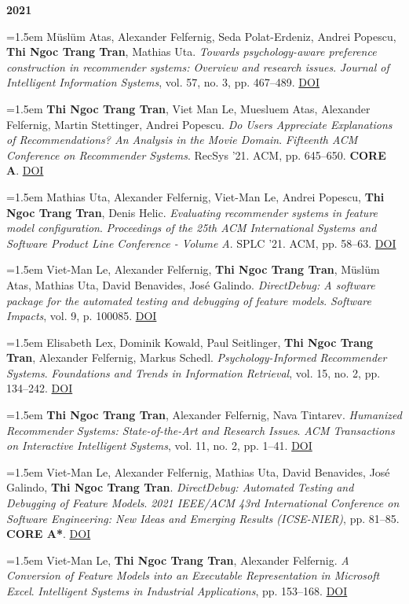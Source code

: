 \documentclass[11pt,a4paper]{article}
\newcommand{\pub}[1]{%
  \par\noindent\hangindent=1.5em\hangafter=1 #1\par\vspace{0.5ex}}
\newcommand{\pubyear}[1]{\vspace{0.7ex}\par\noindent\textbf{#1}\par\vspace{0.2ex}}
\begin{document}
\pubyear{2021}
\pub{Müslüm Atas, Alexander Felfernig, Seda Polat-Erdeniz, Andrei Popescu, \textbf{Thi Ngoc Trang Tran}, Mathias Uta. \textit{Towards psychology-aware preference construction in recommender systems: Overview and research issues}. \textit{Journal of Intelligent Information Systems}, vol. 57, no. 3, pp. 467–489. \href{https://doi.org/10.1007/s10844-021-00674-5}{DOI}}
\pub{\textbf{Thi Ngoc Trang Tran}, Viet Man Le, Muesluem Atas, Alexander Felfernig, Martin Stettinger, Andrei Popescu. \textit{Do Users Appreciate Explanations of Recommendations? An Analysis in the Movie Domain}. \textit{Fifteenth ACM Conference on Recommender Systems}. RecSys ’21. ACM, pp. 645–650. \textbf{CORE A}. \href{https://doi.org/10.1145/3460231.3478859}{DOI}}
\pub{Mathias Uta, Alexander Felfernig, Viet-Man Le, Andrei Popescu, \textbf{Thi Ngoc Trang Tran}, Denis Helic. \textit{Evaluating recommender systems in feature model configuration}. \textit{Proceedings of the 25th ACM International Systems and Software Product Line Conference - Volume A}. SPLC ’21. ACM, pp. 58–63. \href{https://doi.org/10.1145/3461001.3471144}{DOI}}
\pub{Viet-Man Le, Alexander Felfernig, \textbf{Thi Ngoc Trang Tran}, Müslüm Atas, Mathias Uta, David Benavides, José Galindo. \textit{DirectDebug: A software package for the automated testing and debugging of feature models}. \textit{Software Impacts}, vol. 9, p. 100085. \href{https://doi.org/10.1016/j.simpa.2021.100085}{DOI}}
\pub{Elisabeth Lex, Dominik Kowald, Paul Seitlinger, \textbf{Thi Ngoc Trang Tran}, Alexander Felfernig, Markus Schedl. \textit{Psychology-Informed Recommender Systems}. \textit{Foundations and Trends\textregistered{} in Information Retrieval}, vol. 15, no. 2, pp. 134–242. \href{https://doi.org/10.1561/1500000090}{DOI}}
\pub{\textbf{Thi Ngoc Trang Tran}, Alexander Felfernig, Nava Tintarev. \textit{Humanized Recommender Systems: State-of-the-Art and Research Issues}. \textit{ACM Transactions on Interactive Intelligent Systems}, vol. 11, no. 2, pp. 1–41. \href{https://doi.org/10.1145/3446906}{DOI}}
\pub{Viet-Man Le, Alexander Felfernig, Mathias Uta, David Benavides, José Galindo, \textbf{Thi Ngoc Trang Tran}. \textit{DirectDebug: Automated Testing and Debugging of Feature Models}. \textit{2021 IEEE/ACM 43rd International Conference on Software Engineering: New Ideas and Emerging Results (ICSE-NIER)}, pp. 81–85. \textbf{CORE A*}. \href{https://doi.org/10.1109/icse-nier52604.2021.00025}{DOI}}
\pub{Viet-Man Le, \textbf{Thi Ngoc Trang Tran}, Alexander Felfernig. \textit{A Conversion of Feature Models into an Executable Representation in Microsoft Excel}. \textit{Intelligent Systems in Industrial Applications}, pp. 153–168. \href{https://doi.org/10.1007/978-3-030-67148-8_12}{DOI}}
\end{document}
